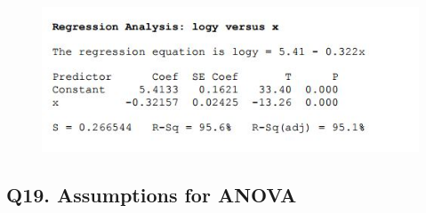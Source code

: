 \documentclass[a4paper,12pt]{article}
\begin{document}
\begin{figure}[h!]
	\centering
	\includegraphics[width=0.8\linewidth]{images/ReviewQ18-d}
\end{figure}

\subsection*{Q19. Assumptions for ANOVA}
\end{document}
